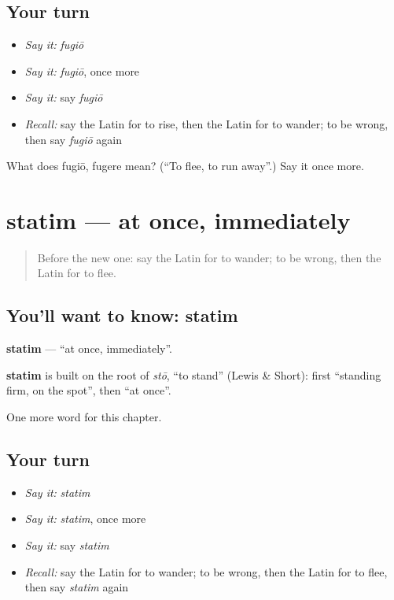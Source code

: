 \subsection*{Your turn}
\begin{itemize}
\raggedright
  \item \emph{Say it:} \emph{fugiō}
  \item \emph{Say it:} \emph{fugiō}, once more
  \item \emph{Say it:} say \emph{fugiō}
  \item \emph{Recall:} say the Latin for to rise, then the Latin for to wander; to be wrong, then say \emph{fugiō} again
\end{itemize}

\begin{tcolorbox}[breakable,colback=teal!4,colframe=teal!35!black,title={Before you move on}]
What does fugiō, fugere mean? (\textquotedblleft{}To flee, to run away\textquotedblright{}.) Say it once more.
\end{tcolorbox}
\section[statim]{statim — at once, immediately}

\label{lesson:LA-C101-statim}



\begin{quote}
Before the new one: say the Latin for to wander; to be wrong, then the Latin for to flee.
\end{quote}

\subsection*{You'll want to know: statim}
\textbf{statim} — \textquotedblleft{}at once, immediately\textquotedblright{}.

\begin{cousinweb}
\textbf{statim} is built on the root of \emph{stō}, \textquotedblleft{}to stand\textquotedblright{} (Lewis \& Short): first \textquotedblleft{}standing firm, on the spot\textquotedblright{}, then \textquotedblleft{}at once\textquotedblright{}.
\end{cousinweb}

\begin{grammarlens}[title={What you've built}]
One more word for this chapter.
\end{grammarlens}

\subsection*{Your turn}
\begin{itemize}
\raggedright
  \item \emph{Say it:} \emph{statim}
  \item \emph{Say it:} \emph{statim}, once more
  \item \emph{Say it:} say \emph{statim}
  \item \emph{Recall:} say the Latin for to wander; to be wrong, then the Latin for to flee, then say \emph{statim} again
\end{itemize}

